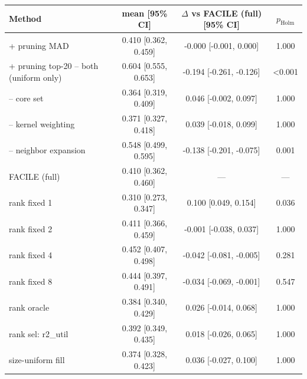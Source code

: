 \begin{tabular}{lccc}
\toprule
Method & mean [95\% CI] & $\Delta$ vs FACILE (full) [95\% CI] & $p_{\mathrm{Holm}}$ \\
\midrule
+ pruning MAD & 0.410 [0.362, 0.459] & -0.000 [-0.001, 0.000] & 1.000 \\
+ pruning top-20%
-- both (uniform only) & 0.604 [0.555, 0.653] & -0.194 [-0.261, -0.126] & <0.001 \\
-- core set & 0.364 [0.319, 0.409] & 0.046 [-0.002, 0.097] & 1.000 \\
-- kernel weighting & 0.371 [0.327, 0.418] & 0.039 [-0.018, 0.099] & 1.000 \\
-- neighbor expansion & 0.548 [0.499, 0.595] & -0.138 [-0.201, -0.075] & 0.001 \\
FACILE (full) & 0.410 [0.362, 0.460] & --- & --- \\
rank fixed 1 & 0.310 [0.273, 0.347] & 0.100 [0.049, 0.154] & 0.036 \\
rank fixed 2 & 0.411 [0.366, 0.459] & -0.001 [-0.038, 0.037] & 1.000 \\
rank fixed 4 & 0.452 [0.407, 0.498] & -0.042 [-0.081, -0.005] & 0.281 \\
rank fixed 8 & 0.444 [0.397, 0.491] & -0.034 [-0.069, -0.001] & 0.547 \\
rank oracle & 0.384 [0.340, 0.429] & 0.026 [-0.014, 0.068] & 1.000 \\
rank sel: r2_util & 0.392 [0.349, 0.435] & 0.018 [-0.026, 0.065] & 1.000 \\
size-uniform fill & 0.374 [0.328, 0.423] & 0.036 [-0.027, 0.100] & 1.000 \\
\bottomrule
\end{tabular}

